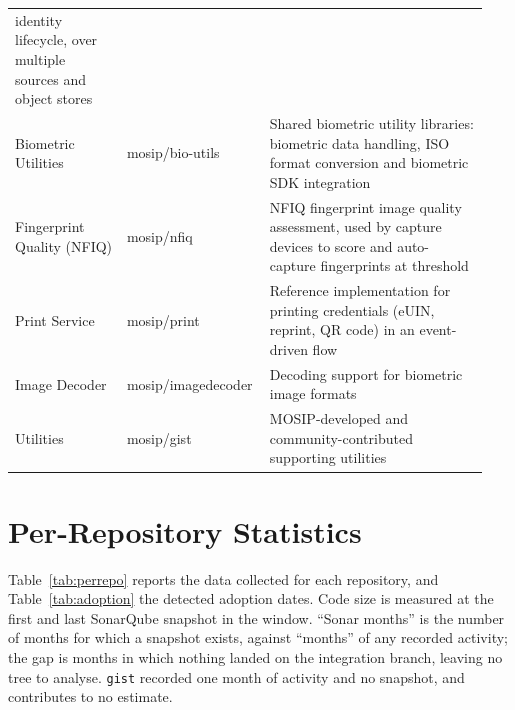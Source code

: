 \begin{longtable}{@{}p{0.235\linewidth}p{0.255\linewidth}p{0.45\linewidth}@{}}
  identity lifecycle, over multiple sources and object stores \\
Biometric Utilities & mosip/bio-utils &
  Shared biometric utility libraries: biometric data handling, ISO format
  conversion and biometric SDK integration \\
Fingerprint Quality (NFIQ) & mosip/nfiq &
  NFIQ fingerprint image quality assessment, used by capture devices to score
  and auto-capture fingerprints at threshold \\
Print Service & mosip/print &
  Reference implementation for printing credentials (eUIN, reprint, QR code)
  in an event-driven flow \\
Image Decoder & mosip/imagedecoder &
  Decoding support for biometric image formats \\
Utilities & mosip/gist &
  MOSIP-developed and community-contributed supporting utilities \\
\end{longtable}


\section{Per-Repository Statistics}
\label{app:perrepo}

Table~\ref{tab:perrepo} reports the data collected for each repository, and
Table~\ref{tab:adoption} the detected adoption dates. Code size is measured at
the first and last SonarQube snapshot in the window. ``Sonar months'' is the
number of months for which a snapshot exists, against ``months'' of any
recorded activity; the gap is months in which nothing landed on the
integration branch, leaving no tree to analyse. \texttt{gist} recorded one
month of activity and no snapshot, and contributes to no estimate.

